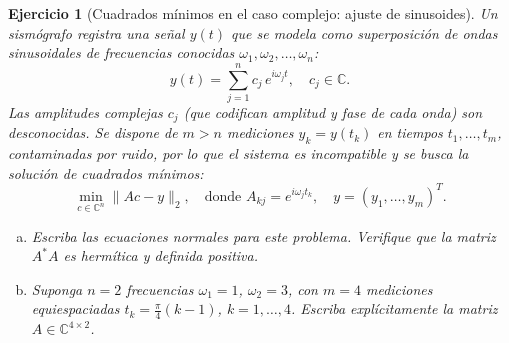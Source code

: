 \documentclass[12pt]{article}
\newtheorem{exercise}{Ejercicio}
\begin{document}
\begin{exercise}[Cuadrados mínimos en el caso complejo: ajuste de sinusoides]
Un sismógrafo registra una señal $y(t)$ que se modela como superposición de ondas sinusoidales de frecuencias conocidas $\omega_1, \omega_2, \ldots, \omega_n$:
\[
y(t) = \sum_{j=1}^n c_j \, e^{i\omega_j t}, \quad c_j \in \mathbb{C}.
\]
Las amplitudes complejas $c_j$ (que codifican amplitud y fase de cada onda) son desconocidas. Se dispone de $m > n$ mediciones $y_k = y(t_k)$ en tiempos $t_1, \ldots, t_m$, contaminadas por ruido, por lo que el sistema es incompatible y se busca la solución de cuadrados mínimos:
\[
\min_{c \in \mathbb{C}^n} \|Ac - y\|_2, \quad \text{donde } A_{kj} = e^{i\omega_j t_k}, \quad y = (y_1, \ldots, y_m)^T.
\]
\begin{enumerate}[(a)]
\item Escriba las ecuaciones normales para este problema. Verifique que la matriz $A^*A$ es hermítica y definida positiva.
\item Suponga $n = 2$ frecuencias $\omega_1 = 1$, $\omega_2 = 3$, con $m = 4$ mediciones equiespaciadas $t_k = \frac{\pi}{4}(k-1)$, $k = 1, \ldots, 4$. Escriba explícitamente la matriz $A \in \mathbb{C}^{4 \times 2}$.
\end{enumerate}
\end{exercise}
\end{document}
